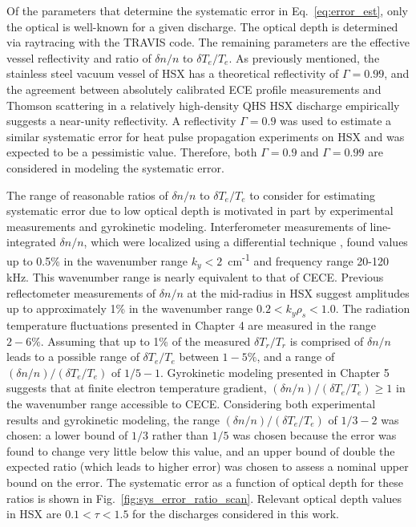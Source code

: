 \documentclass[%
 aip,
 amsmath,amssymb,
 reprint,%
]{revtex4-1}
\begin{document}
Of the parameters that determine the systematic error in Eq.\ \eqref{eq:error_est}, only the optical is well-known for a given discharge. The optical depth is determined via raytracing with the TRAVIS code. The remaining parameters are the effective vessel reflectivity and ratio of $\delta n/n$ to $\delta T_e/T_e$. As previously mentioned, the stainless steel vacuum vessel of HSX has a theoretical reflectivity of $\Gamma=0.99$, and the agreement between absolutely calibrated ECE profile measurements and Thomson scattering in a relatively high-density QHS HSX discharge empirically suggests a near-unity reflectivity. A reflectivity $\Gamma=0.9$ was used to estimate a similar systematic error for heat pulse propagation experiments on HSX \cite{weir-thesis} and was expected to be a pessimistic value. Therefore, both $\Gamma=0.9$ and $\Gamma=0.99$ are considered in modeling the systematic error.

The range of reasonable ratios of $\delta n/n$ to $\delta T_e/T_e$ to consider for estimating systematic error due to low optical depth is motivated in part by experimental measurements and gyrokinetic modeling. Interferometer measurements of line-integrated $\delta n /n$, which were localized using a differential technique \cite{deng2015core}, found values up to 0.5\% in the wavenumber range $k_y < 2$ \,cm\textsuperscript{-1} and frequency range 20-120\,kHz. This wavenumber range is nearly equivalent to that of CECE. Previous reflectometer measurements of $\delta n/n$ at the mid-radius in HSX suggest amplitudes up to approximately 1\% in the wavenumber range $0.2 < k_y \rho_s < 1.0$. The radiation temperature fluctuations presented in Chapter 4 are measured in the range $2-6\%$. Assuming that up to 1\% of the measured $\delta T_r/T_r$ is comprised of $\delta n/n$ leads to a possible range of $\delta T_e/T_e$ between $1-5\%$, and a range of $(\delta n/n)/(\delta T_e/T_e)$ of $1/5-1$.  Gyrokinetic modeling presented in Chapter 5 suggests that at finite electron temperature gradient, $(\delta n/n)/(\delta T_e/T_e) \geq 1$ in the wavenumber range accessible to CECE. Considering both experimental results and gyrokinetic modeling, the range $(\delta n/n)/(\delta T_e/T_e)$ of $1/3-2$ was chosen: a lower bound of $1/3$ rather than $1/5$ was chosen because the error was found to change very little below this value, and an upper bound of double the expected ratio (which leads to higher error) was chosen to assess a nominal upper bound on the error. The systematic error as a function of optical depth for these ratios is shown in Fig.\ \ref{fig:sys_error_ratio_scan}. Relevant optical depth values in HSX are $0.1 < \tau < 1.5$ for the discharges considered in this work.
\end{document}
